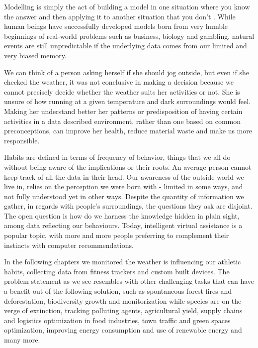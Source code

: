 Modelling is simply the act of building a model in one situation where you know the answer and then applying it to another situation that you don't \cite{KurtThearling}.  While human beings have successfully developed models born from very humble beginnings of real-world problems such as business, biology and gambling, natural events are still unpredictable if the underlying data comes from our limited and very biased memory.

We can think of a person asking herself if she should jog outside, but even if she checked the weather, it was not conclusive in making a decision because we cannot precisely decide whether the weather suits her activities or not. She is unsure of how running at a given temperature and dark surroundings would feel. Making her understand better her patterns or predisposition of having certain activities in a data described environment, rather than one based on common preconceptions, can improve her health, reduce material waste and make us more responsible.

Habits are defined in terms of frequency of behavior, things that we all do without being aware of the implications or their roots. An average person cannot keep track of all the data in their head. Our awareness of the outside world we live in, relies on the perception we were born with - limited in some ways, and not fully understood yet in other ways. Despite the quantity of information we gather, in regards with people's surroundings, the questions they ask are disjoint. The open question is how do we harness the knowledge hidden in plain sight, among data reflecting our behaviours. Today, intelligent virtual assistance is a popular topic, with more and more people preferring to complement their instincts with computer recommendations.

In the following chapters we monitored the weather is influencing our athletic habits, collecting data from fitness trackers and custom built devices. The problem statement as we see resembles with other challenging tasks that can have a benefit out of the following solution, such as spontaneous forest fires and deforestation, biodiversity growth and monitorization while species are on the verge of extinction, tracking polluting agents, agricultural yield, supply chains and logistics optimization in food industries, town traffic and green spaces optimization, improving energy consumption and use of renewable energy and many more. 

